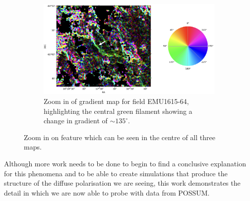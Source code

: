 \begin{figure}
\begin{subfigure}[b]{0.6\textwidth}
        \label{fig: 1615 rm zoom}
    \end{subfigure}
    \begin{subfigure}[b]{0.7\textwidth}
        \includegraphics[width=\linewidth]{Thesis_Template/Figures/1615_grad_zoom_corr.png}
        \caption{Zoom in of gradient map for field EMU1615-64, highlighting the central green filament showing a change in gradient of $\sim 135^\circ$.}
        \label{fig: 1615 grad zoom}
    \end{subfigure}
    \caption{Zoom in on feature which can be seen in the centre of all three maps.}
    \label{fig: 1615 zoom}
\end{figure}


Although more work needs to be done to begin to find a conclusive explanation for this phenomena and to be able to create simulations that produce the structure of the diffuse polarisation we are seeing, this work demonstrates the detail in which we are now able to probe with data from POSSUM.


